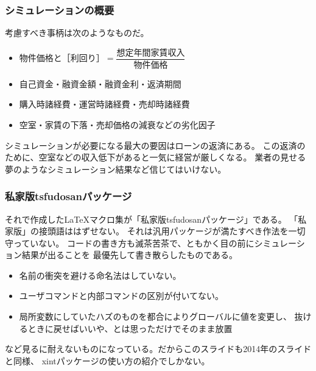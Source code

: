 \documentclass[dvipdfmx]{beamer}
\newcommand{\たつ}{たつ}
\begin{document}
\begin{frame}[fragile]\frametitle{シミュレーションの概要}
  考慮すべき事柄は次のようなものだ。
  \begin{block}{}\small
    \begin{itemize}
    \item 物件価格と$\text{［利回り］}=\dfrac{\text{想定年間家賃収入}}{\text{物件価格}}$
    \item 自己資金・融資金額・融資金利・返済期間
    \item 購入時諸経費・運営時諸経費・売却時諸経費
    \item 空室・家賃の下落・売却価格の減衰などの劣化因子
    \end{itemize}  
  \end{block}
  シミュレーションが必要になる最大の要因はローンの返済にある。
  この返済のために、空室などの収入低下があると一気に経営が厳しくなる。
  業者の見せる夢のようなシミュレーション結果など信じてはいけない。
\end{frame}

\begin{frame}[fragile]\frametitle{私家版\textsf{tsfudosan}パッケージ}
  それで作成した\LaTeX マクロ集が「私家版\textsf{tsfudosan}パッケージ」である。
  「私家版」の接頭語ははずせない。
  それは汎用パッケージが満たすべき作法を一切守っていない。
  コードの書き方も滅茶苦茶で、ともかく目の前にシミュレーション結果が出ることを
  最優先して書き散らしたものである。
  \begin{block}{}\small
    \begin{itemize}
    \item 名前の衝突を避ける命名法はしていない。
    \item ユーザコマンドと内部コマンドの区別が付いてない。
    \item 局所変数にしていたハズのものを都合によりグローバルに値を変更し、
      抜けるときに戻せばいいや、とは思っただけでそのまま放置
    \end{itemize}  
  \end{block}
  など見るに耐えないものになっている。だからこのスライドも2014年のスライドと同様、
  \alert{\textsf{xintパッケージ}}の使い方の紹介でしかない。
\end{frame}
\end{document}

